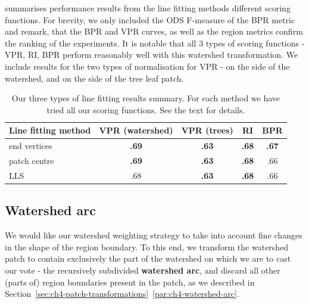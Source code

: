  summarises performance results from the line fitting methods \wrt different scoring functions. For brevity, we only included %
the ODS F-measure of the BPR metric and remark, that the BPR and VPR curves, as well as the region metrics confirm the ranking of the experiments. 
It is notable that all 3 types of scoring functions - VPR, RI, BPR perform reasonably well with this watershed transformation. We include results for the two types of normalisation for VPR - on the side of the watershed, and on the side of the tree leaf patch.

\begin{table}[htbp]
\renewcommand{\arraystretch}{1.3}
\centering
\scriptsize
\begin{tabular}{|l|c|c|c|c|}
\hline 
Line fitting method & VPR (watershed) & VPR (trees) & RI & BPR \\
\hline 
end vertices & {\bf .69} & {\bf .63} & {\bf .68} & {\bf .67} \\
patch centre & {\bf .69} & {\bf .63} & {\bf .68} & .66 \\
LLS & .68 & {\bf .63} & {\bf .68} & .66 \\
\hline
\end{tabular}
\caption[Our three types of line fitting results summary]{Our three types of line fitting results summary. For each method we have tried all our scoring functions. See the text for details.}
\label{tab:line-fitting-experiments}
\end{table}


\subsection{Watershed arc}
We would like our watershed weighting strategy to take into account fine changes in the shape of the region boundary. To this end, we transform the watershed patch to contain exclusively the part of the watershed on which we are to cast our vote - the recursively subdivided {\bf watershed arc}, and discard all other (parts of) region boundaries present in the patch, as we described in Section~\ref*{sec:ch4-patch-transformations}~\ref{par:ch4-watershed-arc}.

